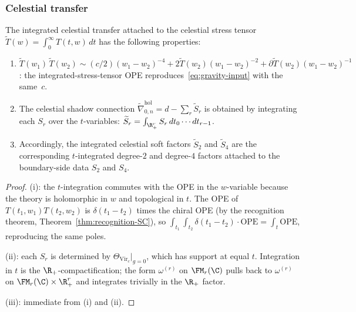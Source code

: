 \subsubsection*{Celestial transfer}

\begin{proposition}
\label{prop:gravity-celestial-soft}
The integrated celestial transfer attached to the celestial stress tensor
$\widetilde{T}(w) = \int_0^\infty T(t,w)\,dt$
has the following properties:
\begin{enumerate}[label=\textup{(\roman*)}]
\item $\widetilde{T}(w_1)\,\widetilde{T}(w_2)
 \sim (c/2)(w_1-w_2)^{-4} + 2\widetilde{T}(w_2)(w_1-w_2)^{-2}
 + \partial\widetilde{T}(w_2)(w_1-w_2)^{-1}$:
 the integrated-stress-tensor OPE reproduces~\eqref{eq:gravity-input} with the
 same~$c$.
\item The celestial shadow connection
 $\widetilde{\nabla}^{\mathrm{hol}}_{0,n}
 = d - \sum_r \widetilde{S}_r$ is obtained by
 integrating each $S_r$ over the $t$-variables:
 $\widetilde{S}_r = \int_{\R_+^r} S_r\,dt_0\cdots dt_{r-1}$.
\item Accordingly, the integrated celestial soft factors
 $\widetilde{S}_2$ and $\widetilde{S}_4$ are the corresponding
 $t$-integrated degree-$2$ and degree-$4$ factors attached to the
 boundary-side data $S_2$ and $S_4$.
\end{enumerate}
\end{proposition}

\begin{proof}
(i): the $t$-integration commutes with the OPE in the $w$-variable
because the theory is holomorphic in $w$ and topological in $t$.
The OPE of $T(t_1,w_1)T(t_2,w_2)$ is $\delta(t_1-t_2)$ times
the chiral OPE (by the recognition theorem,
Theorem~\ref{thm:recognition-SC}), so
$\int_{t_1}\int_{t_2}\delta(t_1-t_2)\cdot\text{OPE}
= \int_t\text{OPE}$, reproducing the same poles.

(ii): each $S_r$ is determined by $\Theta_{\mathrm{Vir}_c}|_{g=0}$,
which has support at equal $t$. Integration in $t$ is the
$\R_+$-compactification; the form $\omega^{(r)}$ on $\FM_r(\C)$
pulls back to $\omega^{(r)}$ on $\FM_r(\C) \times \R_+^r$ and
integrates trivially in the $\R_+$ factor.

(iii): immediate from (i) and (ii).
\end{proof}

